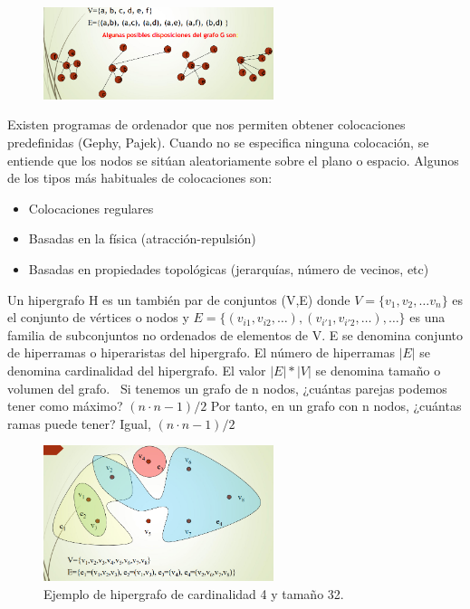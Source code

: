 \begin{figure}[h]
\centering
\includegraphics[width = 0.6\textwidth]{figs/layout.png}
\end{figure}

Existen programas de ordenador que nos permiten obtener colocaciones predefinidas (Gephy, Pajek). Cuando no se especifica ninguna colocación, se entiende que los nodos se sitúan aleatoriamente sobre el plano o espacio. Algunos de los tipos más habituales de colocaciones son:
\begin{itemize}
\item Colocaciones regulares
\item Basadas en la física (atracción-repulsión)
\item Basadas en propiedades topológicas (jerarquías, número de vecinos, etc)
\end{itemize}

Un hipergrafo H es un también par de conjuntos (V,E) donde $V=\{v_1, v_2, \ldots v_n\}$ es el conjunto de vértices o nodos y $E=\{(v_{i1}, v_{i2}, \ldots),(v_{i'1},v_{i'2}, \ldots), \ldots\}$ es una familia de
subconjuntos no ordenados de elementos de V. E se denomina conjunto de hiperramas o hiperaristas del hipergrafo. El número de hiperramas $|E|$ se denomina cardinalidad del hipergrafo. El valor $|E|*|V|$ se denomina tamaño o volumen del grafo.
  \
Si tenemos un grafo de n nodos, ¿cuántas parejas podemos tener como máximo? $(n \cdot n-1)/2$ Por tanto, en un grafo con n nodos, ¿cuántas ramas puede tener? Igual, $(n \cdot n-1)/2$

\begin{figure}[h]
\centering
\includegraphics[width = 0.6\textwidth]{figs/hipergrafo.png}
\caption{Ejemplo de hipergrafo de cardinalidad 4 y tamaño 32.}
\end{figure}

